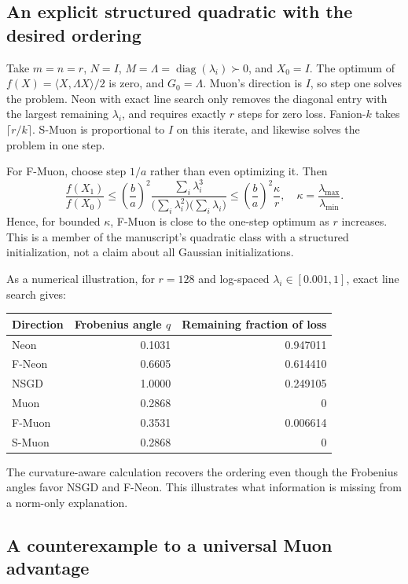 \documentclass[11pt]{article}
\newcommand{\ip}[2]{\langle #1,#2\rangle}
\begin{document}
\subsection{An explicit structured quadratic with the desired ordering}

Take $m=n=r$, $N=I$, $M=\Lambda=\operatorname{diag}(\lambda_i)\succ0$,
and $X_0=I$. The optimum of $f(X)=\ip{X}{\Lambda X}/2$ is zero, and
$G_0=\Lambda$. Muon's direction is $I$, so step one solves the problem.
Neon with exact line search only removes the diagonal entry with the
largest remaining $\lambda_i$, and requires exactly $r$ steps for zero
loss. Fanion-$k$ takes $\lceil r/k\rceil$. S-Muon is proportional to $I$
on this iterate, and likewise solves the problem in one step.

For F-Muon, choose step $1/a$ rather than even optimizing it. Then
\[
 \frac{f(X_1)}{f(X_0)}\leq
 \left(\frac ba\right)^2
 \frac{\sum_i\lambda_i^3}
 {\bigl(\sum_i\lambda_i^2\bigr)\bigl(\sum_i\lambda_i\bigr)}
 \leq \left(\frac ba\right)^2\frac{\kappa}{r},\quad
 \kappa=\frac{\lambda_{\max}}{\lambda_{\min}}.
\]
Hence, for bounded $\kappa$, F-Muon is close to the one-step optimum as
$r$ increases. This is a member of the manuscript's quadratic class with
a structured initialization, not a claim about all Gaussian initializations.

As a numerical illustration, for $r=128$ and log-spaced
$\lambda_i\in[0.001,1]$, exact line search gives:
\begin{center}
\begin{tabular}{lrr}\toprule
Direction & Frobenius angle $q$ & Remaining fraction of loss\\\midrule
Neon & 0.1031 & 0.947011\\
F-Neon & 0.6605 & 0.614410\\
NSGD & 1.0000 & 0.249105\\
Muon & 0.2868 & 0\\
F-Muon & 0.3531 & 0.006614\\
S-Muon & 0.2868 & 0\\\bottomrule
\end{tabular}
\end{center}
The curvature-aware calculation recovers the ordering even though the
Frobenius angles favor NSGD and F-Neon. This illustrates what information
is missing from a norm-only explanation.

\subsection{A counterexample to a universal Muon advantage}
\end{document}
